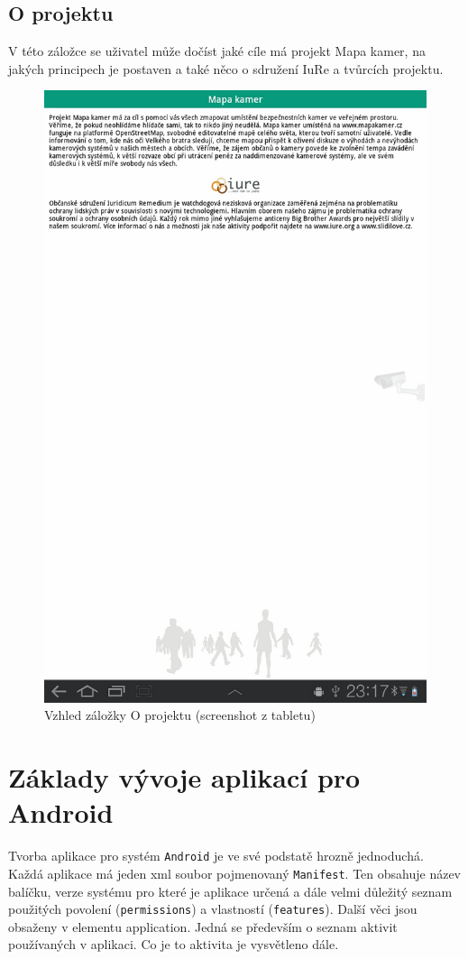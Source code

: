 \subsection{O projektu}
V této záložce se uživatel může dočíst jaké cíle má projekt Mapa kamer, na jakých principech je postaven a také něco o sdružení IuRe a tvůrcích projektu.
\begin{figure}[!ht]
\begin{center}
\includegraphics[scale=0.07]{pics/about.jpg}
\caption{Vzhled záložky O projektu (screenshot z tabletu)}
\end{center}
\end{figure}

\section{Základy vývoje aplikací pro Android}
Tvorba aplikace pro systém \texttt{Android} je ve své podstatě hrozně jednoduchá. Každá aplikace má jeden xml soubor pojmenovaný \texttt{Manifest}. Ten obsahuje název balíčku, verze systému pro které je aplikace určená a dále velmi důležitý seznam použitých povolení (\texttt{permissions}) a vlastností (\texttt{features}). Další věci jsou obsaženy v elementu application. Jedná se především o seznam aktivit používaných v aplikaci. Co je to aktivita je vysvětleno dále.
